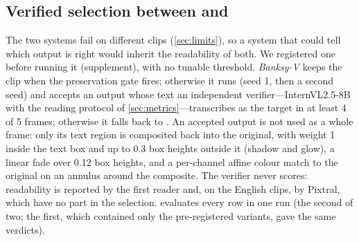 \subsection{Verified selection between \method and \steer}
\label{sec:exp_hybrid}


The two systems fail on different clips (\cref{sec:limits}), so a system that could tell which output is right would inherit the readability of both. We registered one before running it (supplement), with no tunable threshold. \emph{Banksy-V} keeps the clip when the preservation gate fires; otherwise it runs \steer (seed 1, then a second seed) and accepts an output whose text an independent verifier---InternVL2.5-8B with the reading protocol of \cref{sec:metrics}---transcribes as the target in at least 4 of 5 frames; otherwise it falls back to \method. An accepted \steer output is not used as a whole frame: only its text region is composited back into the original, with weight 1 inside the text box and up to 0.3 box heights outside it (shadow and glow), a linear fade over 0.12 box heights, and a per-channel affine colour match to the original on an annulus around the composite. The verifier never scores: readability is reported by the first reader and, on the English clips, by Pixtral, which have no part in the selection.  evaluates every row in one run (the second of two; the first, which contained only the pre-registered variants, gave the same verdicts).

